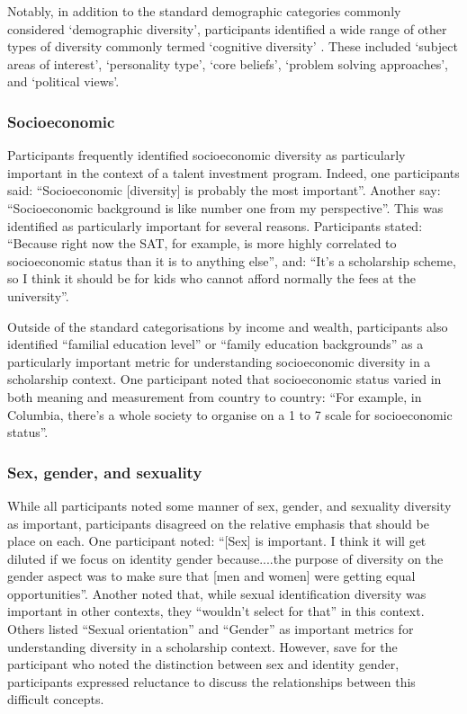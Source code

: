 Notably, in addition to the standard demographic categories commonly considered `demographic diversity', participants identified a wide range of other types of diversity commonly termed `cognitive diversity' \cite{page2019diversity}. These included `subject areas of interest', `personality type', `core beliefs', `problem solving approaches', and `political views'.

\subsubsection{Socioeconomic}
Participants frequently identified socioeconomic diversity as particularly important in the context of a talent investment program. Indeed, one participants said: ``Socioeconomic [diversity] is probably the most important''. Another say: ``Socioeconomic background is like number one from my perspective''. This was identified as particularly important for several reasons. Participants stated: ``Because right now the SAT, for example, is more highly correlated to socioeconomic status than it is to anything else'', and: ``It's a scholarship scheme, so I think it should be for kids who cannot afford normally the fees at the university''.

Outside of the standard categorisations by income and wealth, participants also identified ``familial education level'' or ``family education backgrounds'' as a particularly important metric for understanding socioeconomic diversity in a scholarship context. One participant noted that socioeconomic status varied in both meaning and measurement from country to country: ``For example, in Columbia, there's a whole society to organise on a 1 to 7 scale for socioeconomic status''.

\subsubsection{Sex, gender, and sexuality}
While all participants noted some manner of sex, gender, and sexuality diversity as important, participants disagreed on the relative emphasis that should be place on each. One participant noted: ``[Sex] is important. I think it will get diluted if we focus on identity gender because....the purpose of diversity on the gender aspect was to make sure that [men and women] were getting equal opportunities''. Another noted that, while sexual identification diversity was important in other contexts, they ``wouldn't select for that'' in this context. Others listed ``Sexual orientation'' and ``Gender'' as important metrics for understanding diversity in a scholarship context. However, save for the participant who noted the distinction between sex and identity gender, participants expressed reluctance to discuss the relationships between this difficult concepts.

